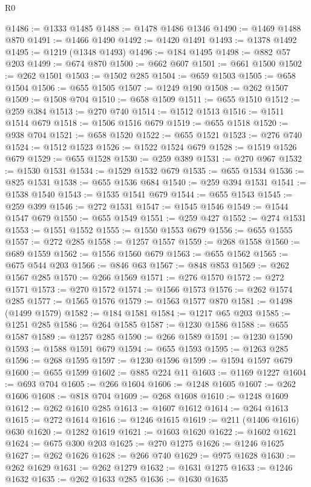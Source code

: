 \begin{lexlean}{R0}
\begin{coremodule}
@1486 := @1333 @1485
@1488 := @1478 @1486 @1346
@1490 := @1469 @1488 @870
@1491 := @1466 @1490
@1492 := @1420 @1491
@1493 := @1378 @1492
@1495 := @1219 (@1348 @1493)
@1496 := @184 @1495
@1498 := @882 @57 @203
@1499 := @674 @870
@1500 := @662 @607
@1501 := @661 @1500
@1502 := @262 @1501
@1503 := @1502 @285
@1504 := @659 @1503
@1505 := @658 @1504
@1506 := @655 @1505
@1507 := @1249 @190
@1508 := @262 @1507
@1509 := @1508 @704
@1510 := @658 @1509
@1511 := @655 @1510
@1512 := @259 @384
@1513 := @270 @740
@1514 := @1512 @1513
@1516 := @1511 @1514 @679
@1518 := @1506 @1516 @679
@1519 := @655 @1518
@1520 := @938 @704
@1521 := @658 @1520
@1522 := @655 @1521
@1523 := @276 @740
@1524 := @1512 @1523
@1526 := @1522 @1524 @679
@1528 := @1519 @1526 @679
@1529 := @655 @1528
@1530 := @259 @389
@1531 := @270 @967
@1532 := @1530 @1531
@1534 := @1529 @1532 @679
@1535 := @655 @1534
@1536 := @825 @1531
@1538 := @655 @1536 @684
@1540 := @259 @394 @1531
@1541 := @1538 @1540
@1543 := @1535 @1541 @679
@1544 := @655 @1543
@1545 := @259 @399
@1546 := @272 @1531
@1547 := @1545 @1546
@1549 := @1544 @1547 @679
@1550 := @655 @1549
@1551 := @259 @427
@1552 := @274 @1531
@1553 := @1551 @1552
@1555 := @1550 @1553 @679
@1556 := @655 @1555
@1557 := @272 @285
@1558 := @1257 @1557
@1559 := @268 @1558
@1560 := @689 @1559
@1562 := @1556 @1560 @679
@1563 := @655 @1562
@1565 := @675 @544 @203
@1566 := @846 @63
@1567 := @848 @853
@1569 := @262 @1567 @285
@1570 := @266 @1569
@1571 := @276 @1570
@1572 := @272 @1571
@1573 := @270 @1572
@1574 := @1566 @1573
@1576 := @262 @1574 @285
@1577 := @1565 @1576
@1579 := @1563 @1577 @870
@1581 := @1498 (@1499 @1579)
@1582 := @184 @1581
@1584 := @1217 @65 @203
@1585 := @1251 @285
@1586 := @264 @1585
@1587 := @1230 @1586
@1588 := @655 @1587
@1589 := @1257 @285
@1590 := @266 @1589
@1591 := @1230 @1590
@1593 := @1588 @1591 @679
@1594 := @655 @1593
@1595 := @1263 @285
@1596 := @268 @1595
@1597 := @1230 @1596
@1599 := @1594 @1597 @679
@1600 := @655 @1599
@1602 := @885 @224 @11
@1603 := @1169 @1227
@1604 := @693 @704
@1605 := @266 @1604
@1606 := @1248 @1605
@1607 := @262 @1606
@1608 := @818 @704
@1609 := @268 @1608
@1610 := @1248 @1609
@1612 := @262 @1610 @285
@1613 := @1607 @1612
@1614 := @264 @1613
@1615 := @272 @1614
@1616 := @1246 @1615
@1619 := @211 (@1406 @1616) @630
@1620 := @1282 @1619
@1621 := @1603 @1620
@1622 := @1602 @1621
@1624 := @675 @300 @203
@1625 := @270 @1275
@1626 := @1246 @1625
@1627 := @262 @1626
@1628 := @266 @740
@1629 := @975 @1628
@1630 := @262 @1629
@1631 := @262 @1279
@1632 := @1631 @1275
@1633 := @1246 @1632
@1635 := @262 @1633 @285
@1636 := @1630 @1635

\end{coremodule}
\end{lexlean}
